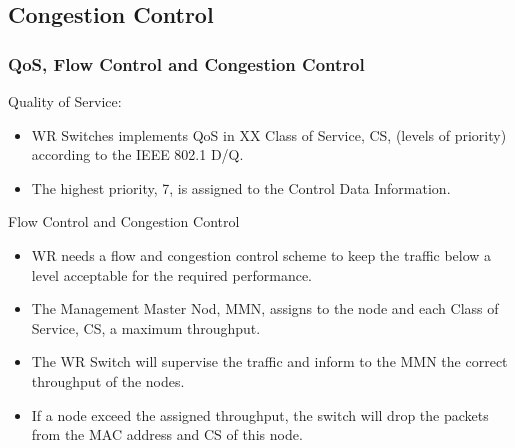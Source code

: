 \documentclass[]{beamer}
\begin{document}
\subsection{Congestion Control}

\begin{frame}
\frametitle{QoS, Flow Control and Congestion Control}

Quality of Service:
\begin{itemize}
\item WR Switches implements QoS in XX Class of Service, CS, (levels of priority) according to the IEEE 802.1 D/Q.
\item The highest priority, 7, is assigned to the Control Data Information.
\end{itemize}

Flow Control and Congestion Control
\begin{itemize}
\item WR needs a flow and congestion control scheme to keep the traffic below a level acceptable for the required performance.
\item The Management Master Nod, MMN, assigns to the node and each Class of Service, CS, a maximum throughput.
\item The WR Switch will supervise the traffic and inform to the MMN the correct throughput of the nodes.
\item If a node exceed the assigned throughput, the switch will drop the packets from the MAC address and CS of this node.
\end{itemize}
\end{frame}
\end{document}
